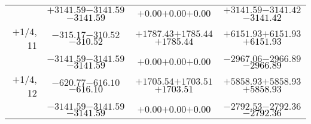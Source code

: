 \documentclass[compress]{beamer}
\begin{document}
\begin{frame}
{\begin{tabular}{r | c | c | c}
           & $+3141.59$\hspace{0.1 cm}$-3141.59$\hspace{0.1 cm}\textcolor{black}{$-3141.59$} & $+0.00$\hspace{0.1 cm}$+0.00$\hspace{0.1 cm}\textcolor{black}{$+0.00$} & $+3141.59$\hspace{0.1 cm}$-3141.42$\hspace{0.1 cm}\textcolor{black}{$-3141.42$} \\
$+$1/4, 11 & $-315.17$\hspace{0.1 cm}$-310.52$\hspace{0.1 cm}\textcolor{black}{$-310.52$} & $+1787.43$\hspace{0.1 cm}$+1785.44$\hspace{0.1 cm}\textcolor{black}{$+1785.44$} & $+6151.93$\hspace{0.1 cm}$+6151.93$\hspace{0.1 cm}\textcolor{black}{$+6151.93$} \\
           & $-3141.59$\hspace{0.1 cm}$-3141.59$\hspace{0.1 cm}\textcolor{black}{$-3141.59$} & $+0.00$\hspace{0.1 cm}$+0.00$\hspace{0.1 cm}\textcolor{black}{$+0.00$} & $-2967.06$\hspace{0.1 cm}$-2966.89$\hspace{0.1 cm}\textcolor{black}{$-2966.89$} \\
$+$1/4, 12 & $-620.77$\hspace{0.1 cm}$-616.10$\hspace{0.1 cm}\textcolor{black}{$-616.10$} & $+1705.54$\hspace{0.1 cm}$+1703.51$\hspace{0.1 cm}\textcolor{black}{$+1703.51$} & $+5858.93$\hspace{0.1 cm}$+5858.93$\hspace{0.1 cm}\textcolor{black}{$+5858.93$} \\
           & $-3141.59$\hspace{0.1 cm}$-3141.59$\hspace{0.1 cm}\textcolor{black}{$-3141.59$} & $+0.00$\hspace{0.1 cm}$+0.00$\hspace{0.1 cm}\textcolor{black}{$+0.00$} & $-2792.53$\hspace{0.1 cm}$-2792.36$\hspace{0.1 cm}\textcolor{black}{$-2792.36$} \\
\end{tabular}}
\end{frame}
\end{document}
